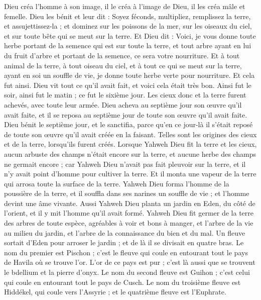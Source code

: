 \begin{multicols}{2}
Dieu créa l'homme à son image, il le créa à l'image de Dieu, il les créa mâle et femelle.
Dieu les bénit et leur dit : Soyez féconds, multipliez, remplissez la terre, et assujettissez-la ; et dominez sur les poissons de la mer, sur les oiseaux du ciel, et sur toute bête qui se meut sur la terre.
Et Dieu dit : Voici, je vous donne toute herbe portant de la semence qui est sur toute la terre, et tout arbre ayant en lui du fruit d'arbre et portant de la semence, ce sera votre nourriture.
Et à tout animal de la terre, à tout oiseau du ciel, et à tout ce qui se meut sur la terre, ayant en soi un souffle de vie, je donne toute herbe verte pour nourriture. Et cela fut ainsi.
Dieu vit tout ce qu'il avait fait, et voici cela était très bon. Ainsi fut le soir, ainsi fut le matin ; ce fut le sixième jour.
\VerseOne{}Les cieux donc et la terre furent achevés, avec toute leur armée.
Dieu acheva au septième jour son œuvre qu'il avait faite, et il se reposa au septième jour de toute son œuvre qu'il avait faite.
Dieu bénit le septième jour, et le sanctifia, parce qu'en ce jour-là il s'était reposé de toute son œuvre qu'il avait créée en la faisant.
Telles sont les origines des cieux et de la terre, lorsqu'ils furent créés.
Lorsque Yahweh Dieu fit la terre et les cieux, aucun arbuste des champs n’était encore sur la terre, et aucune herbe des champs ne germait encore ; car Yahweh Dieu n'avait pas fait pleuvoir sur la terre, et il n'y avait point d'homme pour cultiver la terre.
Et il monta une vapeur de la terre qui arrosa toute la surface de la terre.
Yahweh Dieu forma l'homme de la poussière de la terre, et il souffla dans ses narines un souffle de vie ; et l'homme devint une âme vivante.
Aussi Yahweh Dieu planta un jardin en Eden, du côté de l’orient, et il y mit l'homme qu'il avait formé.
Yahweh Dieu fit germer de la terre des arbres de toute espèce, agréables à voir et bons à manger, et l'arbre de la vie au milieu du jardin, et l'arbre de la connaissance du bien et du mal.
Un fleuve sortait d'Eden pour arroser le jardin ; et de là il se divisait en quatre bras.
Le nom du premier est Pischon ; c'est le fleuve qui coule en entourant tout le pays de Havila où se trouve l'or.
L'or de ce pays est pur ; c'est là aussi que se trouvent le bdellium et la pierre d'onyx.
Le nom du second fleuve est Guihon ; c'est celui qui coule en entourant tout le pays de Cusch.
Le nom du troisième fleuve est Hiddékel, qui coule vers l'Assyrie ; et le quatrième fleuve est l'Euphrate.

\end{multicols}
